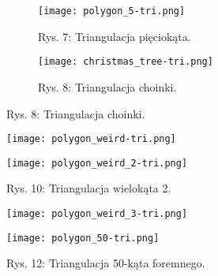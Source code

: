 \begin{figure}[!h]
    \centering
    \begin{subfigure}{.5\textwidth}
      \centering
      \texttt{[image: polygon\_5-tri.png]}
      \caption*{Rys. 7: Triangulacja pięciokąta.}
      \label{fig:sub1}
    \end{subfigure}%
    \begin{subfigure}{.5\textwidth}
      \centering
      \texttt{[image: christmas\_tree-tri.png]}
      \caption*{Rys. 8: Triangulacja choinki.}
      \label{fig:sub2}
    \end{subfigure}
    \label{fig:test}
    \end{figure}

\newpage

    \begin{figure}[!h]
    \centering
    \begin{minipage}{.5\textwidth}
      \centering
      \texttt{[image: polygon\_weird-tri.png]}
      \caption*{Rys. 9: Triangulacja wielokąta 1.}
      \label{fig:test1}
    \end{minipage}%
    \begin{minipage}{.5\textwidth}
      \centering
      \texttt{[image: polygon\_weird\_2-tri.png]}
      \caption*{Rys. 10: Triangulacja wielokąta 2.}
      \label{fig:test2}
    \end{minipage}
    \end{figure}
    \begin{figure}[!h]
        \centering
        \begin{minipage}{.5\textwidth}
          \centering
          \texttt{[image: polygon\_weird\_3-tri.png]}
          \caption*{Rys. 11: Triangulacja wielokąta 3.}
          \label{fig:test1}
        \end{minipage}%
        \begin{minipage}{.5\textwidth}
          \centering
          \texttt{[image: polygon\_50-tri.png]}
          \caption*{Rys. 12: Triangulacja 50-kąta foremnego.}
          \label{fig:test2}
        \end{minipage}
        \end{figure}